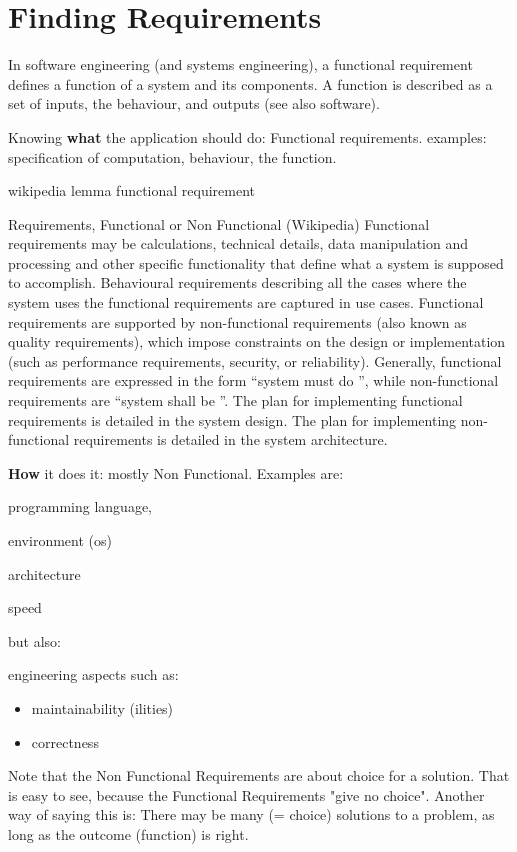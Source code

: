\documentclass[\docroot/main]{subfiles}
\begin{document}
\chapter{Finding Requirements}
In software engineering (and systems engineering), a functional
requirement defines a function of a system and its components. A
function is described as a set of inputs, the behaviour, and outputs
(see also software).

Knowing \textbf{what} the application should do: Functional requirements.
examples: specification of computation, behaviour, the function.

wikipedia lemma functional requirement
\begin{textbox}{Requirements, Functional or Non Functional (Wikipedia)}
  Functional requirements may be calculations, technical details, data
  manipulation and processing and other specific functionality that
  define what a system is supposed to accomplish. Behavioural
  requirements describing all the cases where the system uses the
  functional requirements are captured in use cases. Functional
  requirements are supported by non-functional requirements (also known
  as quality requirements), which impose constraints on the design or
  implementation (such as performance requirements, security, or
  reliability). Generally, functional requirements are expressed in the
  form ``system must do '', while non-functional
  requirements are ``system shall be ''. The plan for
  implementing functional requirements is detailed in the system
  design. The plan for implementing non-functional requirements is
  detailed in the system architecture.


\end{textbox}

\textbf{How} it does it: mostly Non Functional.
Examples are:
\begin{multicols}{2}
\begin{itemize*}
\item programming language,
\item environment (os)
\item architecture
\item speed
\end{itemize*}
\vfill\columnbreak
but also:
\begin{itemize*}
\item engineering aspects such as:
  \begin{itemize}
  \item maintainability  (ilities)
  \item correctness
  \end{itemize}
\end{itemize*}
\end{multicols}
Note that the Non Functional Requirements  are about choice for a
solution. That is easy to see, because the Functional Requirements
"give no choice". Another way of saying this is: There may be many (= choice)
solutions to a problem, as long as the outcome (function) is right.
\end{document}
